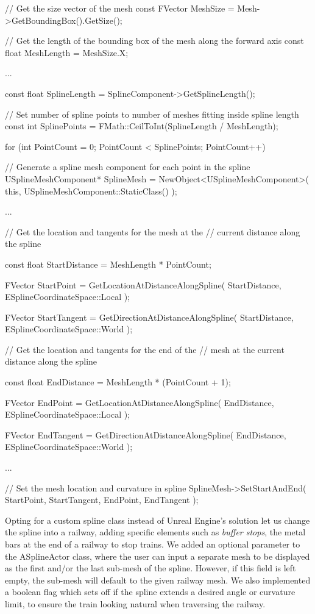 \begin{code}

// Get the size vector of the mesh
const FVector MeshSize = Mesh->GetBoundingBox().GetSize();
	
// Get the length of the bounding box of the mesh along the forward axis
const float MeshLength = MeshSize.X;

...

const float SplineLength = SplineComponent->GetSplineLength();

// Set number of spline points to number of meshes fitting inside spline length
const int SplinePoints = FMath::CeilToInt(SplineLength / MeshLength);

for (int PointCount = 0; PointCount < SplinePoints; PointCount++)
{
	// Generate a spline mesh component for each point in the spline
	USplineMeshComponent* SplineMesh = 
	NewObject<USplineMeshComponent>(
	    this, USplineMeshComponent::StaticClass()
	);

	...
	
	// Get the location and tangents for the mesh at the 
	// current distance along the spline
	
	const float StartDistance = MeshLength * PointCount;
	
	FVector StartPoint = GetLocationAtDistanceAlongSpline(
	    StartDistance, ESplineCoordinateSpace::Local
    );
	    
	FVector StartTangent = GetDirectionAtDistanceAlongSpline(
	    StartDistance, ESplineCoordinateSpace::World
    );
    
	// Get the location and tangents for the end of the 
	// mesh at the current distance along the spline

	const float EndDistance = MeshLength * (PointCount + 1);
	
	FVector EndPoint = GetLocationAtDistanceAlongSpline(
	    EndDistance, ESplineCoordinateSpace::Local
	);
	
	FVector EndTangent = GetDirectionAtDistanceAlongSpline(
	    EndDistance, ESplineCoordinateSpace::World
	);
	
	...
	
	// Set the mesh location and curvature in spline
	SplineMesh->SetStartAndEnd(
	    StartPoint, 
	    StartTangent, 
	    EndPoint, 
	    EndTangent
    );
}
\end{code}

Opting for a custom spline class instead of Unreal Engine's solution let us change the spline into a railway, adding specific elements such as \textit{buffer stops}, the metal bars at the end of a railway to stop trains. We added an optional parameter to the ASplineActor class, where the user can input a separate mesh to be displayed as the first and/or the last sub-mesh of the spline. However, if this field is left empty, the sub-mesh will default to the given railway mesh. We also implemented a boolean flag which sets off if the spline extends a desired angle or curvature limit, to ensure the train looking natural when traversing the railway. \newline

